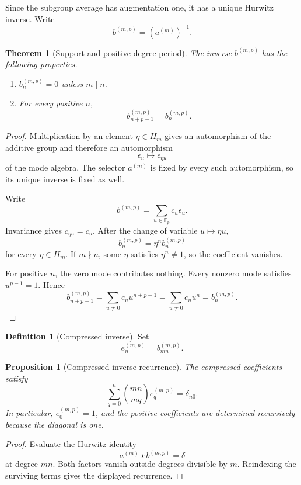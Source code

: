 \documentclass{aomart}
\newtheorem{theorem}{Theorem}[section]
\newtheorem{proposition}[proposition]{Proposition}
\theoremstyle{definition}
\newtheorem{definition}[definition]{Definition}
\theoremstyle{remark}
\newcommand{\FF}{\mathbb F}
\newcommand{\starh}{\mathbin{\star}}
\begin{document}
Since the subgroup average has augmentation one, it has a unique Hurwitz inverse. Write
\[
b^{(m,p)}
=
(a^{(m)})^{-1}.
\]

\begin{theorem}[Support and positive degree period]\label{thm:support_period}
The inverse \(b^{(m,p)}\) has the following properties.
\begin{enumerate}
\item \(b_n^{(m,p)}=0\) unless \(m\mid n\).
\item For every positive \(n\),
\[
\boxed{
b_{n+p-1}^{(m,p)}
=
b_n^{(m,p)}.
}
\]
\end{enumerate}
\end{theorem}

\begin{proof}
Multiplication by an element \(\eta\in H_m\) gives an automorphism of the additive group and therefore an automorphism
\[
\epsilon_u\longmapsto\epsilon_{\eta u}
\]
of the mode algebra. The selector \(a^{(m)}\) is fixed by every such automorphism, so its unique inverse is fixed as well.

Write
\[
b^{(m,p)}
=
\sum_{u\in\FF_p}c_u\epsilon_u.
\]
Invariance gives \(c_{\eta u}=c_u\). After the change of variable \(u\mapsto\eta u\),
\[
b_n^{(m,p)}
=
\eta^n b_n^{(m,p)}
\]
for every \(\eta\in H_m\). If \(m\nmid n\), some \(\eta\) satisfies \(\eta^n\neq1\), so the coefficient vanishes.

For positive \(n\), the zero mode contributes nothing. Every nonzero mode satisfies \(u^{p-1}=1\). Hence
\[
b_{n+p-1}^{(m,p)}
=
\sum_{u\neq0}c_uu^{n+p-1}
=
\sum_{u\neq0}c_uu^n
=
b_n^{(m,p)}.
\]
\end{proof}

\begin{definition}[Compressed inverse]\label{def:compressed_inverse}
Set
\[
e_n^{(m,p)}
=
b_{mn}^{(m,p)}.
\]
\end{definition}

\begin{proposition}[Compressed inverse recurrence]\label{prop:compressed_inverse_recurrence}
The compressed coefficients satisfy
\[
\boxed{
\sum_{q=0}^{n}
\binom{mn}{mq}
e_q^{(m,p)}
=
\delta_{n0}.
}
\]
In particular, \(e_0^{(m,p)}=1\), and the positive coefficients are determined recursively because the diagonal is one.
\end{proposition}

\begin{proof}
Evaluate the Hurwitz identity
\[
a^{(m)}\starh b^{(m,p)}=\delta
\]
at degree \(mn\). Both factors vanish outside degrees divisible by \(m\). Reindexing the surviving terms gives the displayed recurrence.
\end{proof}
\end{document}
